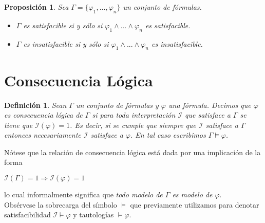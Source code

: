 \documentclass[letterpaper,12pt]{article}
\newtheorem{define}{Definición}[]
\newtheorem{prop}{Proposición}[]
\begin{document}
    \begin{prop}
        Sea $\Gamma = \{ \varphi_{1},..., \varphi_{n}\}$ un conjunto de 
        fórmulas.
        \begin{itemize}
            \item $\Gamma$ es satisfacible si y sólo si
            $\varphi_{1} \land ... \land \varphi_{n}$ es satisfacible.
            \item $\Gamma$ es insatisfacible si y sólo si 
            $\varphi_{1} \land ... \land \varphi_{n}$ es insatisfacible.
        \end{itemize}
    \end{prop}

    \section{Consecuencia Lógica}
    \begin{define}
        Sean $\Gamma$ un conjunto de fórmulas y $\varphi$ una fórmula. Decimos
        que $\varphi$ es consecuencia lógica de $\Gamma$ si para toda 
        interpretación $\mathcal{I}$ que satisface a $\Gamma$ se tiene que 
        $\mathcal{I}(\varphi) = 1$. Es decir, si se cumple que siempre que 
        $\mathcal{I}$ satisface a $\Gamma$ entonces necesariamente 
        $\mathcal{I}$ satisface a $\varphi$. En tal caso escribimos 
        $\Gamma \models \varphi$.
    \end{define}

    \justify
    Nótese que la relación de consecuencia lógica está dada por una implicación
    de la forma 
    \begin{center}
        $\mathcal{I}(\Gamma) = 1 \Rightarrow \mathcal{I}(\varphi) = 1$
    \end{center}

    \justify
    lo cual informalmente significa que \textit{todo modelo de $\Gamma$ es 
    modelo de $\varphi$}. \\
    Obsérvese la sobrecarga del símbolo $\models$ que previamente utilizamos
    para denotar satisfacibilidad $\mathcal{I} \models \varphi$ y tautologías
    $\models \varphi$.
\end{document}
